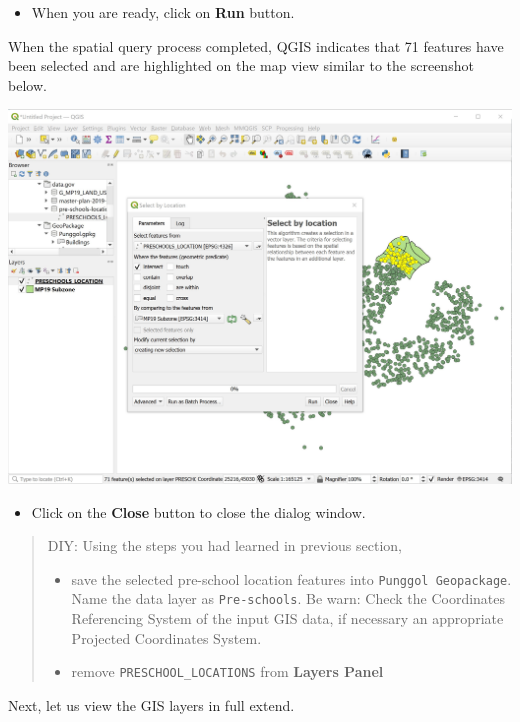 \documentclass[
  letterpaper,
  DIV=11,
  numbers=noendperiod]{scrreprt}
\providecommand{\tightlist}{%
  \setlength{\itemsep}{0pt}\setlength{\parskip}{0pt}}\usepackage{longtable,booktabs,array}
\begin{document}
\begin{itemize}
\tightlist
\item
  When you are ready, click on \textbf{Run} button.
\end{itemize}

When the spatial query process completed, QGIS indicates that 71
features have been selected and are highlighted on the map view similar
to the screenshot below.

\includegraphics{./img04/image95.jpg}

\begin{itemize}
\tightlist
\item
  Click on the \textbf{Close} button to close the dialog window.
\end{itemize}

\begin{quote}
DIY: Using the steps you had learned in previous section,

\begin{itemize}
\item
  save the selected pre-school location features into
  \texttt{Punggol\ Geopackage}. Name the data layer as
  \texttt{Pre-schools}. Be warn: Check the Coordinates Referencing
  System of the input GIS data, if necessary an appropriate Projected
  Coordinates System.
\item
  remove \texttt{PRESCHOOL\_LOCATIONS} from \textbf{Layers Panel}
\end{itemize}
\end{quote}

Next, let us view the GIS layers in full extend.
\end{document}
